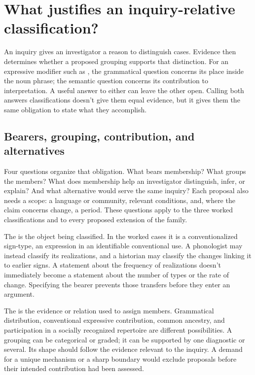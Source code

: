 \section{What justifies an inquiry-relative classification?}\label{sec:assessment}

An inquiry gives an investigator a reason to distinguish cases. Evidence then
determines whether a proposed grouping supports that distinction. For an
expressive modifier such as , the grammatical question concerns
its place inside the noun phrase; the semantic question concerns its
contribution to interpretation. A useful answer to either can leave the other
open. Calling both answers classifications doesn't give them equal evidence,
but it gives them the same obligation to state what they accomplish.

\subsection{Bearers, grouping, contribution, and alternatives}

Four questions organize that obligation. What bears membership? What groups
the members? What does membership help an investigator distinguish, infer, or
explain? And what alternative would serve the same inquiry? Each proposal
also needs a scope: a language or community, relevant conditions, and, where
the claim concerns change, a period. These questions apply to the three
worked classifications and to every proposed extension of the family.

The  is the object being classified. In the worked cases it is
a conventionalized sign-type, an expression in an identifiable conventional
use. A phonologist may instead classify its realizations, and a historian
may classify the changes linking it to earlier signs. A statement about the
frequency of realizations doesn't immediately become a statement about the
number of types or the rate of change. Specifying the bearer prevents those
transfers before they enter an argument.

The  is the evidence or relation used to assign members.
Grammatical distribution, conventional expressive contribution, common
ancestry, and participation in a socially recognized repertoire are different
possibilities. A grouping can be categorical or graded; it can be supported
by one diagnostic or several. Its shape should follow the evidence relevant
to the inquiry. A demand for a unique mechanism or a sharp boundary would
exclude proposals before their intended contribution had been assessed.

